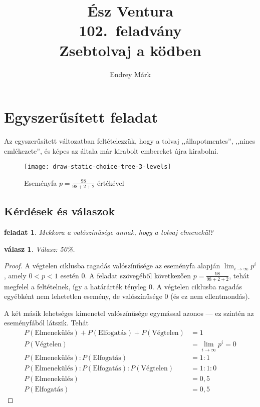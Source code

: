 \documentclass{article}
\author{Endrey Márk}
\title{Ész Ventura\\102.~feladvány\\Zsebtolvaj a ködben}
\newtheorem{task}{feladat}
\newtheorem{answer}{válasz}
\newcommand{\parenthesed}[1]{\left(#1\right)}
\begin{document}
	\maketitle

	\tableofcontents

	\section{Egyszerűsített feladat}

	Az egyszerűsített változatban feltételezzük, hogy a tolvaj ,,állapotmentes'', ,,nincs emlékezete'', és képes az általa már kirabolt embereket újra kirabolni.

	\begin{figure}[H]
		\caption*{Eseményfa $p = \frac{98}{98+2+2}$ értékével}
		\centering
		\texttt{[image: draw-static-choice-tree-3-levels]}
	\end{figure}

	\subsection{Kérdések és válaszok}

	\begin{task}
		Mekkora a valószínűsége annak, hogy a tolvaj elmenekül?
	\end{task}

	\begin{answer}
		Válasz: 50\%.
	\end{answer}

	\begin{proof}
		A végtelen ciklusba ragadás valószínűsége az eseményfa alapján $\lim_{i\to\infty}p^i$, amely $0 < p < 1$ esetén $0$.
		A feladat szövegéből következően $p = \frac{98}{98+2+2}$, tehát megfelel a feltételnek, így a határárték tényleg 0.
		A végtelen ciklusba ragadás egyébként nem lehetetlen esemény, de valószínűsége 0 (és ez nem ellentmondás).

		A két másik lehetséges kimenetel valószínűsége egymással azonos --- ez szintén az eseményfából látszik.
		Tehát
		\begin{align}
			P\parenthesed{\text{Elmenekülés}} + P\parenthesed{\text{Elfogatás}} + P\parenthesed{\text{Végtelen}} &= 1\\
			P\parenthesed{\text{Végtelen}} &= \lim_{i\to\infty}p^i = 0\\
			P\parenthesed{\text{Elmenekülés}} : P\parenthesed{\text{Elfogatás}} &= 1 : 1\\
			P\parenthesed{\text{Elmenekülés}} : P\parenthesed{\text{Elfogatás}} : P\parenthesed{\text{Végtelen}} &= 1 : 1 : 0\\
			P\parenthesed{\text{Elmenekülés}} &= 0,5\\
			P\parenthesed{\text{Elfogatás}} &= 0,5
		\end{align}
	\end{proof}
\end{document}
